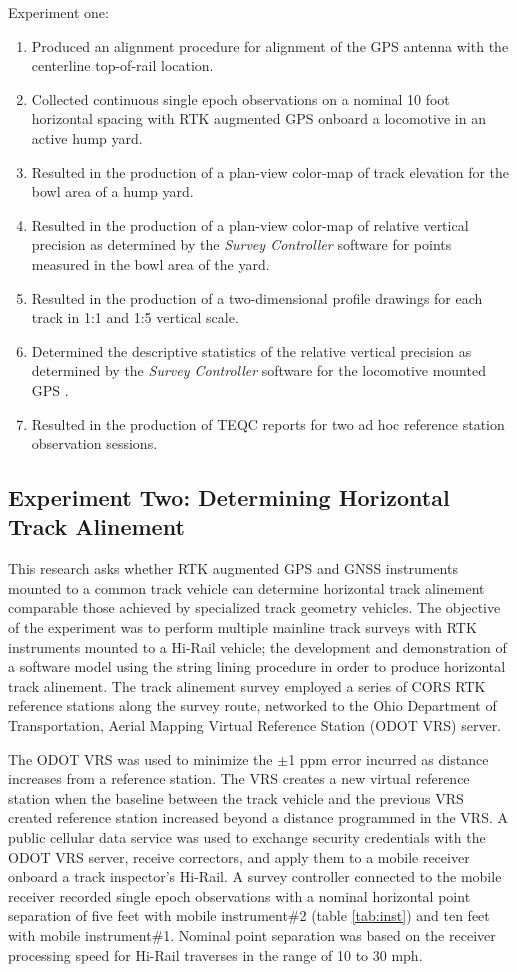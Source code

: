 Experiment one:
\begin{enumerate}
	\item Produced an alignment procedure for alignment of the GPS antenna with the centerline top-of-rail location.
	\item  Collected continuous single epoch observations on a nominal 10 foot horizontal spacing with RTK augmented GPS onboard a locomotive in an active hump yard. 
	\item Resulted in the production of a plan-view color-map of track elevation for the bowl area of a hump yard.
	\item Resulted in the production of a plan-view color-map of relative vertical precision as determined by the \emph{Survey Controller} software for points measured in the bowl area of the yard.
	\item Resulted in the production of a two-dimensional profile drawings for each track in 1:1 and 1:5 vertical scale.
	\item Determined the descriptive statistics of the relative vertical precision as determined by the \emph{Survey Controller} software for the locomotive mounted GPS .
	\item Resulted in the production of TEQC reports for two ad hoc reference station observation sessions.
\end{enumerate}

\subsection{Experiment Two: Determining Horizontal Track Alinement}
\label{Ex2Design}
This research asks whether RTK augmented GPS and GNSS instruments mounted to a common track vehicle can determine horizontal track alinement comparable those achieved by specialized track geometry vehicles. The objective of the experiment was to perform multiple mainline track surveys with RTK instruments mounted to a Hi-Rail vehicle; the development and demonstration of a software model using the string lining procedure in order to produce horizontal track alinement. The track alinement survey employed a series of CORS RTK reference stations along the survey route, networked to the Ohio Department of Transportation, Aerial Mapping Virtual Reference Station (ODOT VRS) server.

The ODOT VRS was used to minimize the $\pm$1 ppm error incurred as distance increases from a reference station. The VRS creates a new virtual reference station when the baseline between the track vehicle and the previous VRS created reference station increased beyond a distance programmed in the VRS. A public cellular data service was used to exchange security credentials with  the ODOT VRS server, receive correctors, and apply them to a mobile receiver onboard a track inspector's Hi-Rail. A survey controller connected to the mobile receiver recorded single epoch observations with a nominal horizontal point separation of five feet with mobile instrument\#2 (table \ref{tab:inst}) and ten feet with mobile instrument\#1. Nominal point separation was based on the receiver processing speed for Hi-Rail traverses in the range of 10 to 30 mph.

